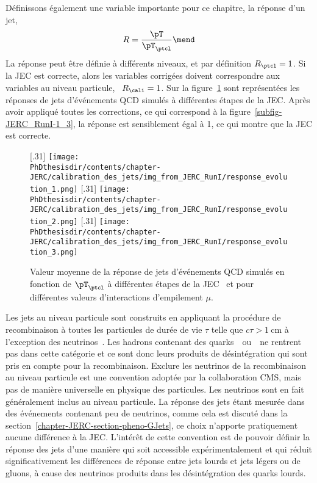 Définissons également une variable importante pour ce chapitre, la réponse d'un jet,
\begin{equation}
R = \frac{\pT}{\pT_\ptcl}
\mend
\end{equation}
La réponse peut être définie à différents niveaux, et par définition $R_\ptcl=1$.
Si la JEC est correcte, alors les variables corrigées doivent correspondre aux variables au niveau particule, \ie\ $R_\cali=1$.
Sur la figure~\ref{fig-JERC_RunI-1} sont représentées les réponses de jets d'événements QCD simulés à différentes étapes de la JEC. Après avoir appliqué toutes les corrections, ce qui correspond à la figure~\ref{subfig-JERC_RunI-1_3}, la réponse est sensiblement égal à 1, ce qui montre que la JEC est correcte.
\begin{figure}[h]
\centering
{}[.31\textwidth]
{\texttt{[image: \\PhDthesisdir/contents/chapter-JERC/calibration\_des\_jets/img\_from\_JERC\_RunI/response\_evolution\_1.png]}}
\hfill
{}[.31\textwidth]
{\texttt{[image: \\PhDthesisdir/contents/chapter-JERC/calibration\_des\_jets/img\_from\_JERC\_RunI/response\_evolution\_2.png]}}
\hfill
{}[.31\textwidth]
{\texttt{[image: \\PhDthesisdir/contents/chapter-JERC/calibration\_des\_jets/img\_from\_JERC\_RunI/response\_evolution\_3.png]}}
\caption{Valeur moyenne de la réponse de jets d'événements QCD simulés en fonction de $\pT_\ptcl$ à différentes étapes de la JEC~\cite{JERC_RunI} et pour différentes valeurs d'interactions d'empilement $\mu$.}
\label{fig-JERC_RunI-1}
\end{figure}
\par Les jets au niveau particule sont construits en appliquant la procédure de recombinaison à toutes les particules de durée de vie $\tau$ telle que $c\tau>\SI{1}{\centi\meter}$ à l'exception des neutrinos~\cite{JERC_RunI}.
Les hadrons contenant des quarks~\quarkc\ ou~\quarkb\ ne rentrent pas dans cette catégorie et ce sont donc leurs produits de désintégration qui sont pris en compte pour la recombinaison.
Exclure les neutrinos de la recombinaison au niveau particule est une convention adoptée par la collaboration CMS, mais pas de manière universelle en physique des particules.
Les neutrinos sont en fait généralement inclus au niveau particule.
La réponse des jets étant mesurée dans des événements contenant peu de neutrinos, comme cela est discuté dans la section~\ref{chapter-JERC-section-pheno-GJets}, ce choix n'apporte pratiquement aucune différence à la JEC.
L'intérêt de cette convention est de pouvoir définir la réponse des jets d'une manière qui soit accessible expérimentalement et qui réduit significativement les différences de réponse entre jets lourds et jets légers ou de gluons, à cause des neutrinos produits dans les désintégration des quarks lourds.
